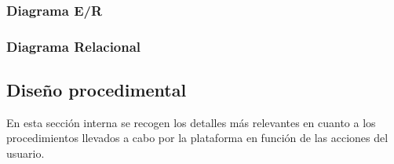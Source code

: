 \clearpage
\begin{landscape}
\subsubsection{Diagrama E/R}
\end{landscape}

\subsubsection{Diagrama Relacional}
\FloatBarrier

\subsection{Diseño procedimental}
En esta sección interna se recogen los detalles más relevantes en cuanto a los procedimientos llevados a cabo por la plataforma en función de las acciones del usuario.

